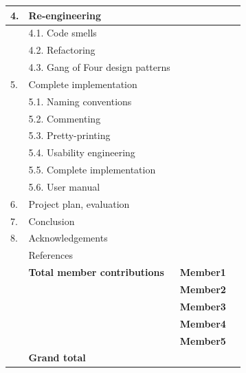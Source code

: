 \documentclass[12pt,a4paper]{article}
\begin{document}
\begin{longtable}{| p{0.2cm} p{6.25cm} | p{3cm}| p{5cm} |}
  4. & Re-engineering &  &  \\ \hline
   & 4.1. Code smells &  &  \\ \hline
   & 4.2. Refactoring &  &  \\ \hline
   & 4.3. Gang of Four design patterns &  &  \\ \hline
  5. & Complete implementation &  &  \\ \hline
   & 5.1. Naming conventions &  &  \\ \hline
   & 5.2. Commenting &  &  \\ \hline
   & 5.3. Pretty-printing &  &  \\ \hline
   & 5.4. Usability engineering &  &  \\ \hline
   & 5.5. Complete implementation &  &  \\ \hline
   & 5.6. User manual &  &  \\ \hline
  6. & Project plan, evaluation &  &  \\ \hline
  7. & Conclusion &  &  \\ \hline
  8. & Acknowledgements &  &  \\ \hline
   & References &  &  \\ \hline
    & \textbf{Total member contributions} & \textbf{Member1} & \\ \cline{3-4}
    &  & \textbf{Member2} & \\ \cline{3-4}
    &  & \textbf{Member3} & \\ \cline{3-4}
    &  & \textbf{Member4} & \\ \cline{3-4}
    &  & \textbf{Member5} & \\ \hline
    & \textbf{Grand total} &  &  \\ \hline
\end{longtable}
\end{document}
